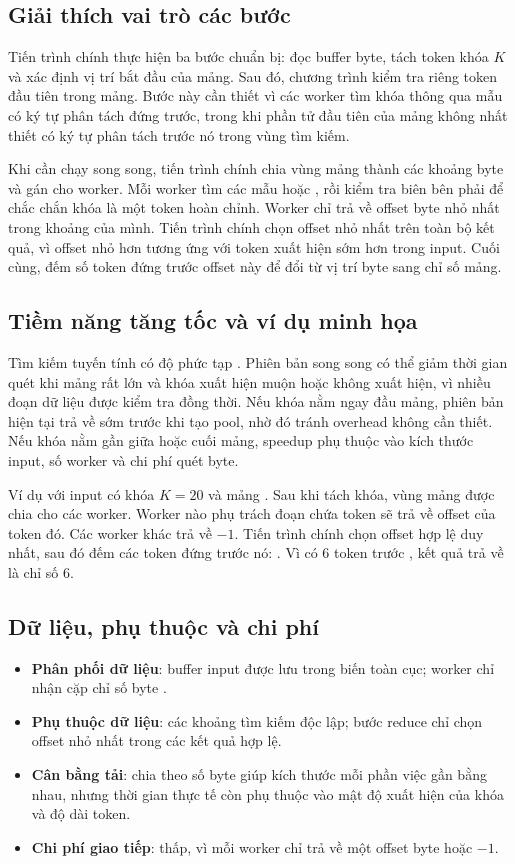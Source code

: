 \subsection{Giải thích vai trò các bước}
Tiến trình chính thực hiện ba bước chuẩn bị: đọc buffer byte, tách token khóa $K$ và xác định vị trí bắt đầu của mảng. Sau đó, chương trình kiểm tra riêng token đầu tiên trong mảng. Bước này cần thiết vì các worker tìm khóa thông qua mẫu có ký tự phân tách đứng trước, trong khi phần tử đầu tiên của mảng không nhất thiết có ký tự phân tách trước nó trong vùng tìm kiếm.

Khi cần chạy song song, tiến trình chính chia vùng mảng thành các khoảng byte và gán cho worker. Mỗi worker tìm các mẫu  hoặc , rồi kiểm tra biên bên phải để chắc chắn khóa là một token hoàn chỉnh. Worker chỉ trả về offset byte nhỏ nhất trong khoảng của mình. Tiến trình chính chọn offset nhỏ nhất trên toàn bộ kết quả, vì offset nhỏ hơn tương ứng với token xuất hiện sớm hơn trong input. Cuối cùng,  đếm số token đứng trước offset này để đổi từ vị trí byte sang chỉ số mảng.

\subsection{Tiềm năng tăng tốc và ví dụ minh họa}
Tìm kiếm tuyến tính có độ phức tạp . Phiên bản song song có thể giảm thời gian quét khi mảng rất lớn và khóa xuất hiện muộn hoặc không xuất hiện, vì nhiều đoạn dữ liệu được kiểm tra đồng thời. Nếu khóa nằm ngay đầu mảng, phiên bản hiện tại trả về sớm trước khi tạo pool, nhờ đó tránh overhead không cần thiết. Nếu khóa nằm gần giữa hoặc cuối mảng, speedup phụ thuộc vào kích thước input, số worker và chi phí quét byte.

Ví dụ với input có khóa $K=20$ và mảng . Sau khi tách khóa, vùng mảng được chia cho các worker. Worker nào phụ trách đoạn chứa token  sẽ trả về offset của token đó. Các worker khác trả về $-1$. Tiến trình chính chọn offset hợp lệ duy nhất, sau đó đếm các token đứng trước nó: . Vì có 6 token trước , kết quả trả về là chỉ số $6$.

\subsection{Dữ liệu, phụ thuộc và chi phí}
\begin{itemize}
  \item \textbf{Phân phối dữ liệu}: buffer input được lưu trong biến toàn cục; worker chỉ nhận cặp chỉ số byte .
  \item \textbf{Phụ thuộc dữ liệu}: các khoảng tìm kiếm độc lập; bước reduce chỉ chọn offset nhỏ nhất trong các kết quả hợp lệ.
  \item \textbf{Cân bằng tải}: chia theo số byte giúp kích thước mỗi phần việc gần bằng nhau, nhưng thời gian thực tế còn phụ thuộc vào mật độ xuất hiện của khóa và độ dài token.
  \item \textbf{Chi phí giao tiếp}: thấp, vì mỗi worker chỉ trả về một offset byte hoặc $-1$.
\end{itemize}

